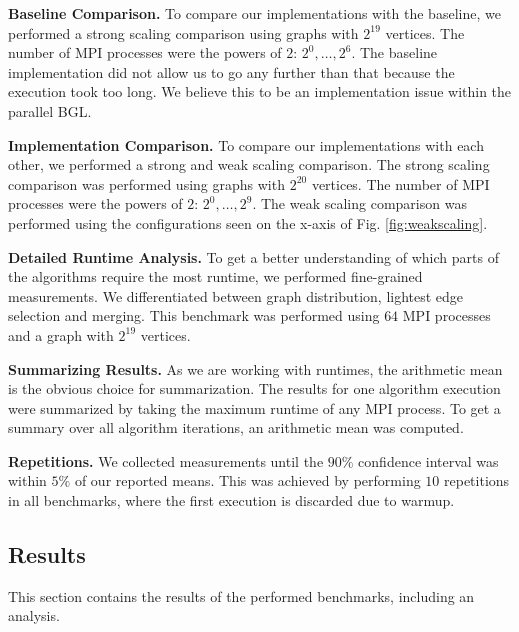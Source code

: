 \documentclass[letterpaper]{article}
\newcommand{\mypar}[1]{{\bf #1.}}
\begin{document}
\mypar{Baseline Comparison}
To compare our implementations with the baseline, we performed a strong scaling comparison using graphs with $2^{19}$
vertices. The number of MPI processes were the powers of $2$: $2^0, \dotsc, 2^6$. The baseline implementation did not
allow us to go any further than that because the execution took too long. We believe this to be an implementation issue
within the parallel BGL.

\mypar{Implementation Comparison}
To compare our implementations with each other, we performed a strong and weak scaling comparison. The strong scaling
comparison was performed using graphs with $2^{20}$ vertices. The number of MPI processes were the powers of $2$: $2^0,
\dotsc, 2^9$. The weak scaling comparison was performed using the configurations seen on the x-axis of Fig.
\ref{fig:weakscaling}.

\mypar{Detailed Runtime Analysis}
To get a better understanding of which parts of the algorithms require the most runtime, we performed fine-grained
measurements. We differentiated between graph distribution, lightest edge selection and merging. This benchmark was
performed using $64$ MPI processes and a graph with $2^{19}$ vertices.

\mypar{Summarizing Results}
As we are working with runtimes, the arithmetic mean is the obvious choice for summarization. The results for one
algorithm execution were summarized by taking the maximum runtime of any MPI process. To get a summary over all
algorithm iterations, an arithmetic mean was computed. 

\mypar{Repetitions}
We collected measurements until the $90\%$ confidence interval was within $5\%$ of our reported means. This was achieved
by performing $10$ repetitions in all benchmarks, where the first execution is discarded due to warmup.

\subsection{Results}
\label{sec:results}
This section contains the results of the performed benchmarks, including an analysis.

\end{document}
